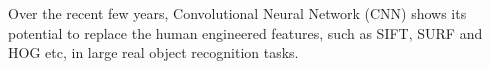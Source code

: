 ﻿Over the recent few years, Convolutional Neural Network (CNN) shows its potential to replace the human engineered features, such as SIFT\cite{lowe1999object}, SURF\cite{bay2006surf} and HOG\cite{dalal2005histograms} etc, in large real object recognition tasks.   \cite{krizhevsky2012imagenet}  \cite{szegedy2014going} 